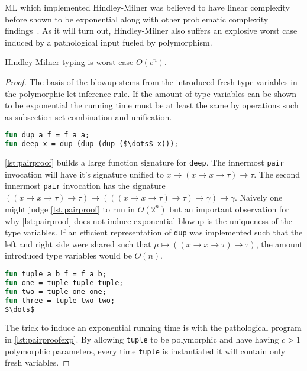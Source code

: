 \documentclass[11pt,oneside,a4paper]{report}
\begin{document}
ML which implemented Hindley-Milner was believed to have linear complexity before shown to be exponential along with other problematic complexity findings~\cite{mairson1989deciding}.
As it will turn out, Hindley-Milner also suffers an explosive worst case induced by a pathological input fueled by polymorphism.

\begin{lemma}
    Hindley-Milner typing is worst case $O(c^n)$.
\end{lemma}
\begin{proof}
    The basis of the blowup stems from the introduced fresh type variables in the polymorphic let inference rule.
    If the amount of type variables can be shown to be exponential the running time must be at least the same by operations such as subsection set combination and unification.
\begin{lstlisting}[language=ML,caption={Nested pair},label={lst:pairproof},mathescape=true]
fun dup a f = f a a;
fun deep x = dup (dup (dup ($\dots$ x)));
\end{lstlisting}
    \autoref{lst:pairproof} builds a large function signature for \texttt{deep}.
    The innermost \texttt{pair} invocation will have it's signature unified to $x \rightarrow (x \rightarrow x \rightarrow \tau) \rightarrow \tau$.
    The second innermost \texttt{pair} invocation has the signature $((x \rightarrow x \rightarrow \tau) \rightarrow \tau) \rightarrow (((x \rightarrow x \rightarrow \tau) \rightarrow \tau) \rightarrow \gamma) \rightarrow \gamma$.
    Naively one might judge \autoref{lst:pairproof} to run in $O(2^n)$ but an important observation for why \autoref{lst:pairproof} does not induce exponential blowup is the uniqueness of the type variables.
    If an efficient representation of \texttt{dup} was implemented such that the left and right side were shared such that $\mu \mapsto ((x \rightarrow x \rightarrow \tau) \rightarrow \tau)$, the amount introduced type variables would be $O(n)$.
\begin{lstlisting}[language=ML,caption={Nested pairs with different type variables},label={lst:pairproofexp},mathescape=true]
fun tuple a b f = f a b;
fun one = tuple tuple tuple;
fun two = tuple one one;
fun three = tuple two two;
$\dots$
\end{lstlisting}
    The trick to induce an exponential running time is with the pathological program in \autoref{lst:pairproofexp}.
    By allowing \texttt{tuple} to be polymorphic and have having $c > 1$ polymorphic parameters, every time \texttt{tuple} is instantiated it will contain only fresh variables.

\end{proof}
\end{document}

